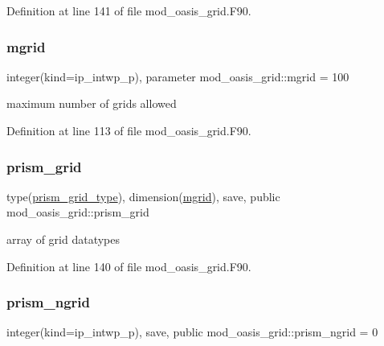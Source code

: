 Definition at line 141 of file mod\+\_\+oasis\+\_\+grid.\+F90.

\mbox{\label{namespacemod__oasis__grid_a9df267c5d7acbb73eb35d6aaf10ab59e}} 
\subsubsection{\texorpdfstring{mgrid}{mgrid}}
{\footnotesize\ttfamily integer(kind=ip\+\_\+intwp\+\_\+p), parameter mod\+\_\+oasis\+\_\+grid\+::mgrid = 100\hspace{0.3cm}{\ttfamily [private]}}



maximum number of grids allowed 



Definition at line 113 of file mod\+\_\+oasis\+\_\+grid.\+F90.

\mbox{\label{namespacemod__oasis__grid_a43b75282e77fd687bd7173f4f78abcb1}} 
\subsubsection{\texorpdfstring{prism\+\_\+grid}{prism\_grid}}
{\footnotesize\ttfamily type(\hyperlink{structmod__oasis__grid_1_1prism__grid__type}{prism\+\_\+grid\+\_\+type}), dimension(\hyperlink{namespacemod__oasis__grid_a9df267c5d7acbb73eb35d6aaf10ab59e}{mgrid}), save, public mod\+\_\+oasis\+\_\+grid\+::prism\+\_\+grid}



array of grid datatypes 



Definition at line 140 of file mod\+\_\+oasis\+\_\+grid.\+F90.

\mbox{\label{namespacemod__oasis__grid_ad6e65eb9872825ac98db6ce1f7dcd618}} 
\subsubsection{\texorpdfstring{prism\+\_\+ngrid}{prism\_ngrid}}
{\footnotesize\ttfamily integer(kind=ip\+\_\+intwp\+\_\+p), save, public mod\+\_\+oasis\+\_\+grid\+::prism\+\_\+ngrid = 0}



